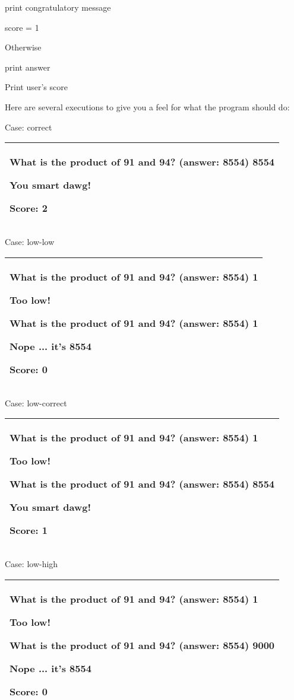 \documentclass[
]{article}
\begin{document}
print congratulatory message

score = 1

Otherwise

print answer

Print user's score

Here are several executions to give you a feel for what the program
should do:

Case: correct

\begin{longtable}[]{@{}l@{}}
\toprule
\endhead
\begin{minipage}[t]{0.97\columnwidth}\raggedright
What is the product of 91 and 94? (answer: 8554) \textbf{8554}

You smart dawg!

Score: 2\strut
\end{minipage}\tabularnewline
\bottomrule
\end{longtable}

Case: low-low

\begin{longtable}[]{@{}l@{}}
\toprule
\endhead
\begin{minipage}[t]{0.97\columnwidth}\raggedright
What is the product of 91 and 94? (answer: 8554) \textbf{1}

Too low!

What is the product of 91 and 94? (answer: 8554) 1

Nope ... it's 8554

Score: 0\strut
\end{minipage}\tabularnewline
\bottomrule
\end{longtable}

Case: low-correct

\begin{longtable}[]{@{}l@{}}
\toprule
\endhead
\begin{minipage}[t]{0.97\columnwidth}\raggedright
What is the product of 91 and 94? (answer: 8554) \textbf{1}

Too low!

What is the product of 91 and 94? (answer: 8554) 8554

You smart dawg!

Score: 1\strut
\end{minipage}\tabularnewline
\bottomrule
\end{longtable}

Case: low-high

\begin{longtable}[]{@{}l@{}}
\toprule
\endhead
\begin{minipage}[t]{0.97\columnwidth}\raggedright
What is the product of 91 and 94? (answer: 8554) \textbf{1}

Too low!

What is the product of 91 and 94? (answer: 8554) 9000

Nope ... it's 8554

Score: 0\strut
\end{minipage}\tabularnewline
\bottomrule
\end{longtable}
\end{document}
